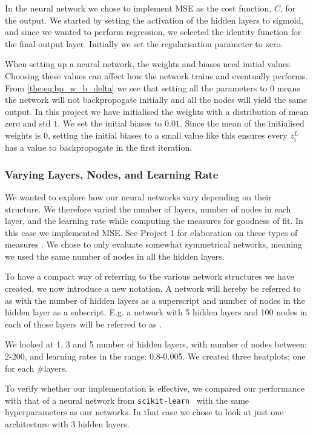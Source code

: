         In the neural network we chose to implement MSE as the cost function, $C$, for the output. We started by setting the activation of the hidden layers to sigmoid, and since we wanted to perform regression, we selected the identity function for the final output layer. Initially we set the regularisation parameter to zero. 

        When setting up a neural network, the weights and biases need initial values. Choosing these values can affect how the network trains and eventually performs. From \cref{the:eq:bp_w_b_delta} we see that setting all the parameters to $0$ means the network will not backpropogate initially and all the nodes will yield the same output. In this project we have initialised the weights with a distribution of mean zero and std $1$. We set the initial biases to $0.01$. Since the mean of the initialised weights is 0, setting the initial biases to a small value like this ensures every $z_i^L$ has a value to backpropogate in the first iteration.  
    
    \subsubsection{Varying Layers, Nodes, and Learning Rate}
        We wanted to explore how our neural networks vary depending on their structure. We therefore varied the number of layers, number of nodes in each layer, and the learning rate while computing the measures for goodness of fit. In this case we implemented MSE. See Project 1 for elaboration on these types of measures \citep{Project1}.
        We chose to only evaluate somewhat symmetrical networks, meaning we used the same number of nodes in all the hidden layers.

        To have a compact way of referring to the various network structures we have created, we now introduce a new notation. A network will hereby be referred to as  with the number of hidden layers as a superscript and number of nodes in the hidden layer as a subscript. E.g. a network with 5 hidden layers and 100 nodes in each of those layers will be referred to as .  

        We looked at 1, 3 and 5 number of hidden layers, with number of nodes between: 2-200, and learning rates in the range: 0.8-0.005. We created three heatplots; one for each \#layers. 

        To verify whether our implementation is effective, we compared our performance with that of a neural network from \verb|scikit-learn|~\citep{scikit-learn} with the same hyperparameters as our networks. In that case we chose to look at just one architecture with 3 hidden layers. 

